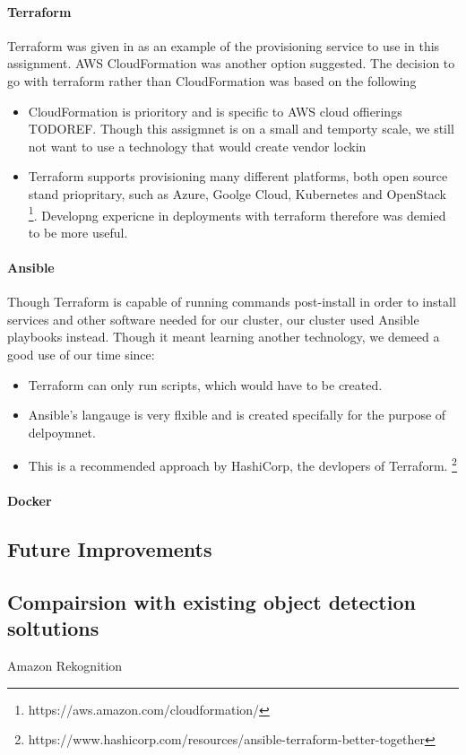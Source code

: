 \documentclass[conference]{IEEEtran}
\begin{document}
\paragraph{Terraform}
Terraform was given in as an example of the provisioning service to use in this assignment. AWS CloudFormation was another option suggested. The decision to go with terraform rather than CloudFormation was based on the following
\begin{itemize}
  \item CloudFormation is prioritory and is specific to AWS cloud offierings TODOREF. Though this assigmnet is on a small and temporty scale, we still not want to use a technology that would create vendor lockin
  \item Terraform supports provisioning many different platforms, both open source stand priopritary, such as Azure, Goolge Cloud, Kubernetes and OpenStack \footnote{https://aws.amazon.com/cloudformation/}. Developng expericne in deployments with terraform therefore was demied to be more useful.
\end{itemize}
\paragraph{Ansible}
Though Terraform is capable of running commands post-install in order to install services and other software needed for our cluster, our cluster used Ansible playbooks instead. Though it meant learning another technology, we demeed a good use of our time since:
\begin{itemize}
  \item Terraform can only run scripts, which would have to be created.
  \item Ansible's langauge is very flxible and is created specifally for the purpose of delpoymnet.
  \item This is a recommended approach by HashiCorp, the devlopers of Terraform. \footnote{https://www.hashicorp.com/resources/ansible-terraform-better-together}
\end{itemize}
\paragraph{Docker}
\subsection{Future Improvements}

\subsection{Compairsion with existing object detection soltutions}
Amazon Rekognition
\end{document}
